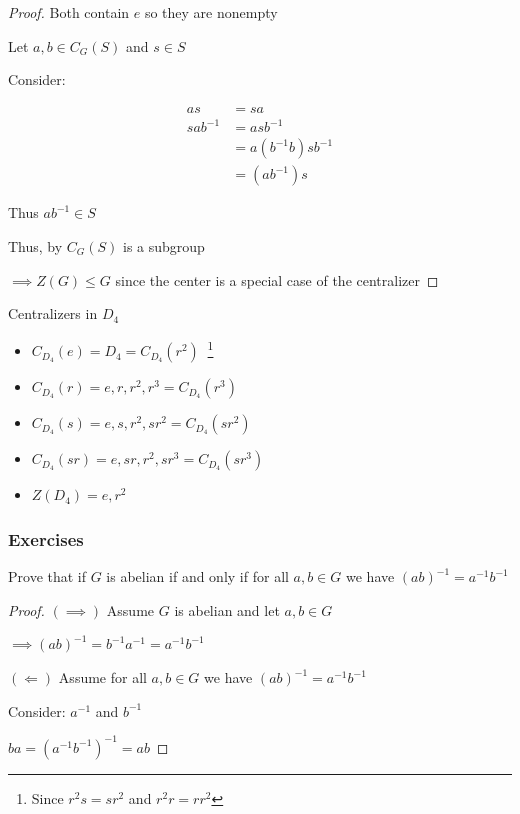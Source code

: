 \begin{proof}
    Both contain $e$ so they are nonempty

    Let \(a,b \in C_G(S)\) and \(s \in S\)

    Consider:

    \begin{align*}
        as&=sa\\
        sab^{-1}&=asb^{-1}\\
                &=a(b^{-1}b)sb^{-1}\\
                &=(ab^{-1})s
    \end{align*}

    Thus $ab^{-1} \in S$

    Thus, by  $C_G(S)$ is a subgroup

    \(\implies Z(G) \leq G\) since the center is a special case of the centralizer
\end{proof}
\newpage
\begin{example}
    Centralizers in $D_4$

    \begin{itemize}
        \item $C_{D_4}(e)=D_4=C_{D_4}(r^2)\;\;$\footnote{Since $r^2s=sr^2$ and $r^2r=rr^2$}
        \item $C_{D_4}(r)={e,r,r^2,r^3}=C_{D_4}(r^3)$
        \item $C_{D_4}(s)={e,s,r^2,sr^2}=C_{D_4}(sr^2)$
        \item $C_{D_4}(sr)={e,sr,r^2,sr^3}=C_{D_4}(sr^3)$
        \item $Z(D_4)={e,r^2}$
    \end{itemize}
\end{example}

\newpage
\subsubsection{Exercises}
\begin{example}
    Prove that if $G$ is abelian if and only if for all \(a,b \in G\)
    we have $(ab)^{-1}=a^{-1}b^{-1}$

    \begin{proof}
        $(\implies)$ Assume $G$ is abelian and let $a,b \in G$

        \(\implies (ab)^{-1}=b^{-1}a^{-1}=a^{-1}b^{-1}\)

        $(\Longleftarrow)$ Assume for all \(a,b\in G\) we have \((ab)^{-1}=a^{-1}b^{-1}\)

        Consider: \(a^{-1}\) and \(b^{-1}\)

        \(ba=(a^{-1}b^{-1})^{-1}=ab\)
    \end{proof}
\end{example}


